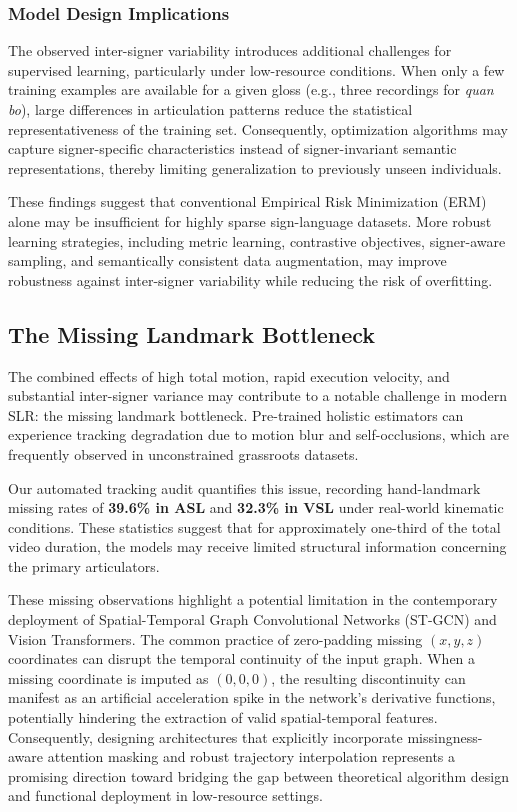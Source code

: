 \documentclass{ieeeaccess}
\begin{document}
\subsubsection{Model Design Implications}

The observed inter-signer variability introduces additional challenges for supervised learning, particularly under low-resource conditions. When only a few training examples are available for a given gloss (e.g., three recordings for \emph{quan bo}), large differences in articulation patterns reduce the statistical representativeness of the training set. Consequently, optimization algorithms may capture signer-specific characteristics instead of signer-invariant semantic representations, thereby limiting generalization to previously unseen individuals.

These findings suggest that conventional Empirical Risk Minimization (ERM) alone may be insufficient for highly sparse sign-language datasets. More robust learning strategies, including metric learning, contrastive objectives, signer-aware sampling, and semantically consistent data augmentation, may improve robustness against inter-signer variability while reducing the risk of overfitting.

\subsection{The Missing Landmark Bottleneck}
\label{sec:missing_landmarks}

The combined effects of high total motion, rapid execution velocity, and substantial inter-signer variance may contribute to a notable challenge in modern SLR: the missing landmark bottleneck. Pre-trained holistic estimators can experience tracking degradation due to motion blur and self-occlusions, which are frequently observed in unconstrained grassroots datasets.

Our automated tracking audit quantifies this issue, recording hand-landmark missing rates of \textbf{39.6\% in ASL} and \textbf{32.3\% in VSL} under real-world kinematic conditions. These statistics suggest that for approximately one-third of the total video duration, the models may receive limited structural information concerning the primary articulators.

These missing observations highlight a potential limitation in the contemporary deployment of Spatial-Temporal Graph Convolutional Networks (ST-GCN) and Vision Transformers. The common practice of zero-padding missing $(x,y,z)$ coordinates can disrupt the temporal continuity of the input graph. When a missing coordinate is imputed as $(0,0,0)$, the resulting discontinuity can manifest as an artificial acceleration spike in the network's derivative functions, potentially hindering the extraction of valid spatial-temporal features. Consequently, designing architectures that explicitly incorporate missingness-aware attention masking and robust trajectory interpolation represents a promising direction toward bridging the gap between theoretical algorithm design and functional deployment in low-resource settings.
\end{document}

